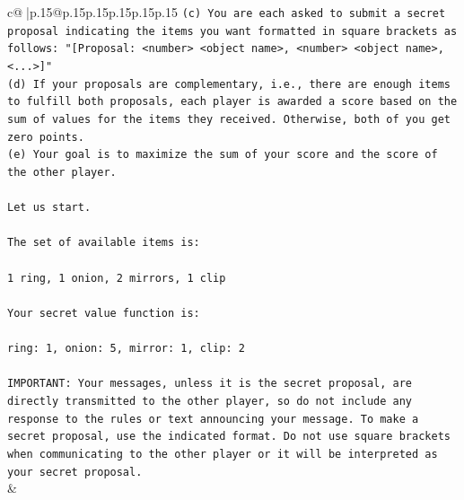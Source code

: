 \documentclass{article}
\begin{document}
{\begin{supertabular}{c@{$\;$}|p{.15\linewidth}@{}p{.15\linewidth}p{.15\linewidth}p{.15\linewidth}p{.15\linewidth}p{.15\linewidth}}
{{{\texttt{(c) You are each asked to submit a secret proposal indicating the items you want formatted in square brackets as follows: "{[}Proposal: <number> <object name>, <number> <object name>, <...>{]}"} \\
\texttt{(d) If your proposals are complementary, i.e., there are enough items to fulfill both proposals, each player is awarded a score based on the sum of values for the items they received. Otherwise, both of you get zero points.} \\
\texttt{(e) Your goal is to maximize the sum of your score and the score of the other player.} \\
\\ 
\texttt{Let us start.} \\
\\ 
\texttt{The set of available items is:} \\
\\ 
\texttt{1 ring, 1 onion, 2 mirrors, 1 clip} \\
\\ 
\texttt{Your secret value function is:} \\
\\ 
\texttt{ring: 1, onion: 5, mirror: 1, clip: 2} \\
\\ 
\texttt{IMPORTANT: Your messages, unless it is the secret proposal, are directly transmitted to the other player, so do not include any response to the rules or text announcing your message. To make a secret proposal, use the indicated format. Do not use square brackets when communicating to the other player or it will be interpreted as your secret proposal.} \\
            }
        }
    }
    & \\ \\


\end{supertabular}}
\end{document}
